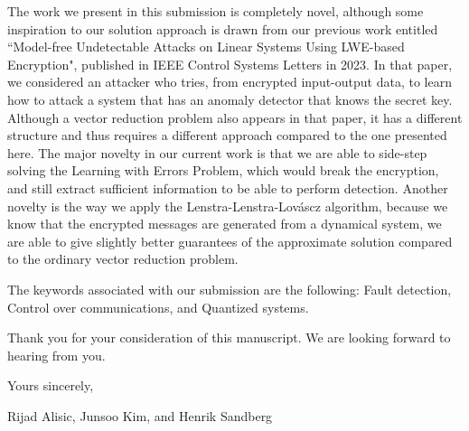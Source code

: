 \documentclass{letter}
\begin{document}
The work we present in this submission is completely novel, although some inspiration to our solution approach is drawn from our previous work entitled ``Model-free Undetectable Attacks on Linear Systems Using LWE-based Encryption", published in IEEE Control Systems Letters in 2023. In that paper, we considered an attacker who tries, from encrypted input-output data, to learn how to attack a system that has an anomaly detector that knows the secret key. Although a vector reduction problem also appears in that paper, it has a different structure and thus requires a different approach compared to the one presented here. The major novelty in our current work is that we are able to side-step solving the Learning with Errors Problem, which would break the encryption, and still extract sufficient information to be able to perform detection. Another novelty is the way we apply the Lenstra-Lenstra-Lov\'ascz algorithm, because we know that the encrypted messages are generated from a dynamical system, we are able to give slightly better guarantees of the approximate solution compared to the ordinary vector reduction problem.

The keywords associated with our submission are the following: Fault detection, Control over communications, and Quantized systems.

Thank you for your consideration of this manuscript. We are looking forward to hearing from you.

Yours sincerely,

Rijad Alisic, Junsoo Kim, and Henrik Sandberg
\end{document}
